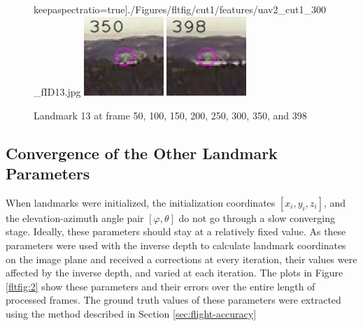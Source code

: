 \begin{figure}[h]
keepaspectratio=true]{./Figures/fltfig/cut1/features/uav2_cut1_300_fID13.jpg}
\includegraphics[width=3cm,
keepaspectratio=true]{./Figures/fltfig/cut1/features/uav2_cut1_350_fID13.jpg}
\includegraphics[width=3cm,
keepaspectratio=true]{./Figures/fltfig/cut1/features/uav2_cut1_398_fID13.jpg}
\caption{Landmark 13 at frame 50, 100, 150, 200, 250, 300, 350, and 398}
\label{fltfig:1_1}
\end{figure}

\subsection{Convergence of the Other Landmark Parameters}
When landmarks were initialized, the initialization coordinates $[x_i,
y_i, z_i]$, and the elevation-azimuth angle pair $[\varphi, \theta]$
do not go through a slow converging stage. Ideally, these parameters
should stay at a relatively fixed value. As these parameters were used
with the inverse depth to calculate landmark coordinates on the image
plane and received a corrections at every iteration, their values were
affected by the inverse depth, and varied at each iteration. The plots
in Figure \ref{fltfig:2} show these parameters and their errors over
the entire length of processed frames. The ground truth values of these
parameters were extracted using the method described in Section
\ref{sec:flight-accuracy}

